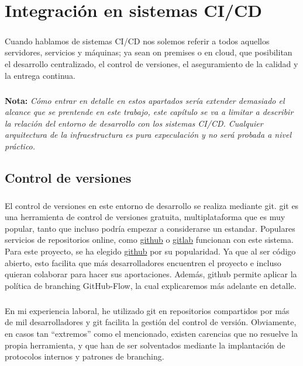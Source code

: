 \chapter{Integración en sistemas CI/CD}\label{sec:cicd}

\paragraph{}Cuando hablamos de sistemas \gls{CI/CD} nos solemos referir a todos aquellos
servidores, servicios y máquinas; ya sean \gls{on premises} o en cloud, que posibilitan
el desarrollo centralizado, el control de versiones, el aseguramiento de la calidad
y la entrega continua.

\paragraph{}\textbf{Nota: }\emph{Cómo entrar en detalle en estos apartados sería extender
demasiado el alcance que se prentende en este trabajo, este capítulo se va a limitar a
describir la relación del entorno de desarrollo con los sistemas \gls{CI/CD}. Cualquier
arquitectura de la infraestructura es pura expeculación y no será probada a nivel práctico.}

\section{Control de versiones}

\paragraph{}El control de versiones en este entorno de desarrollo se realiza mediante
\gls{git}. \Gls{git} es una herramienta de control de versiones gratuita, multiplataforma que
es muy popular, tanto que incluso podría empezar a considerarse un estandar. Populares
servicios de repositorios online, como \href{github.com}{github} o \href{gitlab.com}{gitlab}
funcionan con este sistema. Para este proyecto, se ha elegido \href{github.com}{github}
por su popularidad. Ya que al ser código abierto, esto facilita que más desarrolladores
encuentren el proyecto e incluso quieran colaborar para hacer sus aportaciones. Además,
github permite aplicar la política de branching GitHub-Flow, la cual explicaremos más
adelante en detalle.

\paragraph{}En mi experiencia laboral, he utilizado \gls{git} en repositorios compartidos
por más de mil desarrolladores y \gls{git} facilita la gestión del control de versión.
Obviamente, en casos tan ``extremos'' como el mencionado, existen carencias que no
resuelve la propia herramienta, y que han de ser solventados mediante la implantación
de protocolos internos y patrones de branching.

